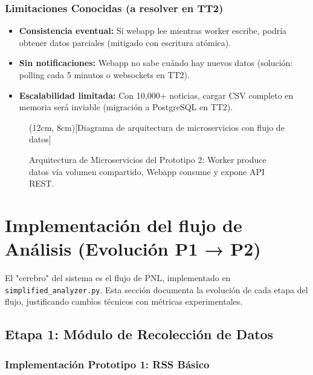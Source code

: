 \subsubsection{Limitaciones Conocidas (a resolver en TT2)}

\begin{itemize}
    \item \textbf{Consistencia eventual:} Si webapp lee mientras worker escribe, podría obtener datos parciales (mitigado con escritura atómica).
    \item \textbf{Sin notificaciones:} Webapp no sabe cuándo hay nuevos datos (solución: polling cada 5 minutos o websockets en TT2).
    \item \textbf{Escalabilidad limitada:} Con 10,000+ noticias, cargar CSV completo en memoria será inviable (migración a PostgreSQL en TT2).
\end{itemize}

\begin{figure}[h]
    \centering
    \framebox(12cm, 8cm){[Diagrama de arquitectura de microservicios con flujo de datos]}
    \caption{Arquitectura de Microservicios del Prototipo 2: Worker produce datos vía volumen compartido, Webapp consume y expone API REST.}
    \label{fig:arquitectura}
\end{figure}

\section{Implementación del flujo de Análisis (Evolución P1 → P2)}
\label{sec:pipeline}

El "cerebro" del sistema es el flujo de PNL, implementado en \texttt{simplified\_analyzer.py}. Esta sección documenta la evolución de cada etapa del flujo, justificando cambios técnicos con métricas experimentales.

\subsection{Etapa 1: Módulo de Recolección de Datos}
\label{subsec:impl_coleccion}

\subsubsection{Implementación Prototipo 1: RSS Básico}

